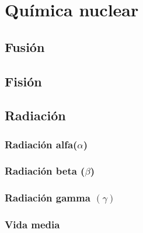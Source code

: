 \section{Química nuclear}


\subsection*{Fusión}

\subsection*{Fisión}

\subsection*{Radiación}

\subsubsection*{Radiación alfa($\alpha$)}

\subsubsection*{Radiación beta ($\beta$)}

\subsubsection*{Radiación gamma $(\gamma)$}

\subsubsection*{Vida media}
